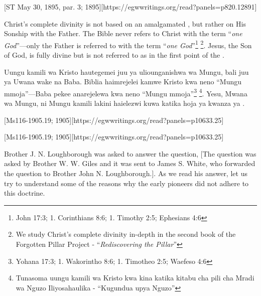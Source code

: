 [ST May 30, 1895, par. 3; 1895][https://egwwritings.org/read?panels=p820.12891]


Christ's complete divinity is not based on an amalgamated , but rather on His Sonship with the Father. The Bible never refers to Christ with the term “\textit{one God}”—only the Father is referred to with the term “\textit{one God}”\footnote{John 17:3; 1. Corinthians 8:6; 1. Timothy 2:5; Ephesians 4:6} \footnote{We study Christ’s complete divinity in-depth  in the second book of the Forgotten Pillar Project - “\textit{Rediscovering the Pillar}”}. Jesus, the Son of God, is fully divine but is not referred to as  in the first point of the .


Uungu kamili wa Kristo hautegemei juu ya  uliounganishwa wa Mungu, bali juu ya Uwana wake na Baba. Biblia haimrejelei kamwe Kristo kwa neno “Mungu mmoja”—Baba pekee anarejelewa kwa neno “Mungu mmoja”\footnote{Yohana 17:3; 1. Wakorintho 8:6; 1. Timotheo 2:5; Waefeso 4:6} \footnote{Tunasoma uungu kamili wa Kristo kwa kina katika kitabu cha pili cha Mradi wa Nguzo Iliyosahaulika - “Kugundua upya Nguzo”}. Yesu, Mwana wa Mungu, ni Mungu kamili lakini haielezwi kuwa  katika hoja ya kwanza ya .


[Ms116-1905.19; 1905][https://egwwritings.org/read?panels=p10633.25]


[Ms116-1905.19; 1905][https://egwwritings.org/read?panels=p10633.25]


Brother J. N. Loughborough was asked to answer the question, [The question was asked by Brother W. W. Giles and it was sent to James S. White, who forwarded the question to Brother John N. Loughborough.]. As we read his answer, let us try to understand some of the reasons why the early pioneers did not adhere to this doctrine.


